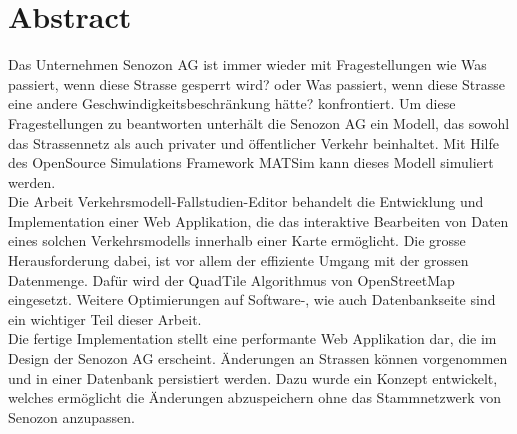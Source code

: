 \chapter{Abstract}
Das Unternehmen Senozon AG ist immer wieder mit Fragestellungen wie \glqq{}Was passiert, wenn diese Strasse gesperrt wird?\grqq{} oder \glqq{}Was passiert, wenn diese Strasse eine andere Geschwindigkeitsbeschränkung hätte?\grqq{} konfrontiert. Um diese Fragestellungen zu beantworten unterhält die Senozon AG ein Modell, das sowohl das Strassennetz als auch privater und öffentlicher Verkehr beinhaltet. Mit Hilfe des OpenSource Simulations Framework MATSim kann dieses Modell simuliert werden.\\
Die Arbeit \glqq{}Verkehrsmodell-Fallstudien-Editor\grqq{} behandelt die Entwicklung und Implementation einer Web Applikation, die das interaktive Bearbeiten von Daten eines solchen Verkehrsmodells innerhalb einer Karte ermöglicht. Die grosse Herausforderung dabei, ist vor allem der effiziente Umgang mit der grossen Datenmenge. Dafür wird der QuadTile Algorithmus von OpenStreetMap \cite{OSMQuadTiles} eingesetzt. Weitere Optimierungen auf Software-, wie auch Datenbankseite sind ein wichtiger Teil dieser Arbeit.\\
Die fertige Implementation stellt eine performante Web Applikation dar, die im Design der Senozon AG erscheint. Änderungen an Strassen können vorgenommen und in einer Datenbank persistiert werden. Dazu wurde ein Konzept entwickelt, welches ermöglicht die Änderungen abzuspeichern ohne das Stammnetzwerk von Senozon anzupassen.\\